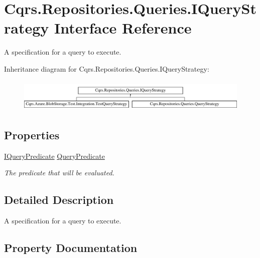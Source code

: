 \hypertarget{interfaceCqrs_1_1Repositories_1_1Queries_1_1IQueryStrategy}{}\section{Cqrs.\+Repositories.\+Queries.\+I\+Query\+Strategy Interface Reference}
\label{interfaceCqrs_1_1Repositories_1_1Queries_1_1IQueryStrategy}


A specification for a query to execute.  


Inheritance diagram for Cqrs.\+Repositories.\+Queries.\+I\+Query\+Strategy\+:\begin{figure}[H]
\begin{center}
\leavevmode
\includegraphics[height=1.568627cm]{interfaceCqrs_1_1Repositories_1_1Queries_1_1IQueryStrategy}
\end{center}
\end{figure}
\subsection*{Properties}
\begin{DoxyCompactItemize}
\item 
\hyperlink{interfaceCqrs_1_1Repositories_1_1Queries_1_1IQueryPredicate}{I\+Query\+Predicate} \hyperlink{interfaceCqrs_1_1Repositories_1_1Queries_1_1IQueryStrategy_ab36e17425ab9940bfa4f104e7f321b90_ab36e17425ab9940bfa4f104e7f321b90}{Query\+Predicate}
\begin{DoxyCompactList}\small\item\em The predicate that will be evaluated. \end{DoxyCompactList}\end{DoxyCompactItemize}


\subsection{Detailed Description}
A specification for a query to execute. 



\subsection{Property Documentation}
\mbox{\label{interfaceCqrs_1_1Repositories_1_1Queries_1_1IQueryStrategy_ab36e17425ab9940bfa4f104e7f321b90_ab36e17425ab9940bfa4f104e7f321b90}} 
